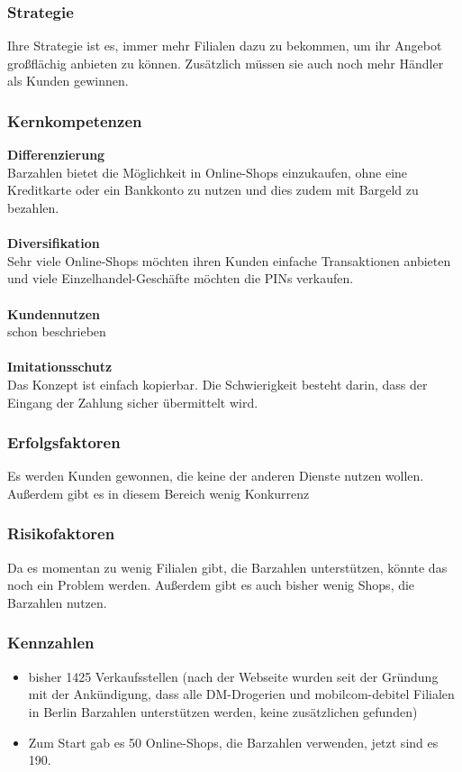 \subsubsection{Strategie}
Ihre Strategie ist es, immer mehr Filialen dazu zu bekommen, um ihr Angebot großflächig anbieten zu können. Zusätzlich müssen sie auch noch mehr Händler als Kunden gewinnen.
\subsubsection{Kernkompetenzen}
\textbf{Differenzierung}\\
Barzahlen bietet die Möglichkeit in Online-Shops einzukaufen, ohne eine Kreditkarte oder ein Bankkonto zu nutzen und dies zudem
mit Bargeld zu bezahlen.\\
\\
\textbf{Diversifikation}\\
Sehr viele Online-Shops möchten ihren Kunden einfache Transaktionen anbieten und viele Einzelhandel-Geschäfte möchten
die PINs verkaufen.\\
\\
\textbf{Kundennutzen}\\
schon beschrieben\\
\\
\textbf{Imitationsschutz}\\
Das Konzept ist einfach kopierbar. Die Schwierigkeit besteht darin, dass der Eingang der Zahlung sicher übermittelt wird.

\subsubsection{Erfolgsfaktoren}
Es werden Kunden gewonnen, die keine der anderen Dienste nutzen wollen. Außerdem gibt es in diesem Bereich wenig Konkurrenz
\subsubsection{Risikofaktoren}
Da es momentan zu wenig Filialen gibt, die Barzahlen unterstützen, könnte das noch ein Problem werden. Außerdem gibt es auch bisher wenig Shops, die Barzahlen nutzen.
\subsubsection{Kennzahlen}
\begin{itemize}
\item bisher 1425 Verkaufsstellen (nach der Webseite wurden seit der Gründung mit der Ankündigung, dass alle DM-Drogerien
und mobilcom-debitel Filialen in Berlin Barzahlen unterstützen werden, keine zusätzlichen gefunden)
\item Zum Start gab es 50 Online-Shops, die Barzahlen verwenden, jetzt sind es 190.
\end{itemize}

